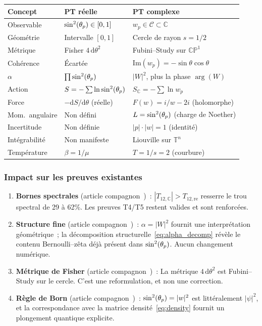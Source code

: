 \documentclass[12pt,a4paper]{article}
\begin{document}
\begin{center}
\begin{tabular}{lll}
\toprule
\textbf{Concept} & \textbf{PT réelle} & \textbf{PT complexe} \\
\midrule
Observable      & $\sin^2(\theta_{p}) \in [0,1]$    & $w_p \in \mathcal{C} \subset \mathbb{C}$ \\
Géométrie       & Intervalle $[0,1]$      & Cercle de rayon $s = 1/2$ \\
Métrique        & Fisher $4\,\mathrm{d}\theta^2$ & Fubini--Study sur $\mathbb{CP}^1$ \\
Cohérence       & Écartée                 & $\mathrm{Im}(w_p) = -\sin\theta\cos\theta$ \\
$\alpha$        & $\prod\sin^2(\theta_{p})$         & $|W|^2$, plus la phase $\arg(W)$ \\
Action          & $S = -\sum\ln\sin^2(\theta_{p})$  & $S_{\mathbb{C}} = -\sum\ln w_p$ \\
Force           & $-\mathrm{d}S/\mathrm{d}\theta$ (réelle) & $F(w) = i/w - 2i$ (holomorphe) \\
Mom.\ angulaire & Non défini              & $L = \sin^2(\theta_{p})$ (charge de Noether) \\
Incertitude     & Non définie             & $|p|\cdot|w| = 1$ (identité) \\
Intégrabilité   & Non manifeste           & Liouville sur $\mathbb{T}^n$ \\
Température     & $\beta = 1/\mu$         & $T = 1/s = 2$ (courbure) \\
\bottomrule
\end{tabular}
\end{center}

\subsubsection{Impact sur les preuves existantes}

\begin{enumerate}[nosep]
\item \textbf{Bornes spectrales} (article
  compagnon~\cite{companion_M3})~:
  $|T_{12,\mathbb{C}}| > T_{12,\mathrm{re}}$ resserre le trou
  spectral de 29 à 62\%. Les preuves T4/T5 restent valides et sont
  renforcées.
\item \textbf{Structure fine} (article
  compagnon~\cite{companion_physics})~:
  $\alpha = |W|^2$ fournit une interprétation géométrique~; la
  décomposition structurelle~\eqref{eq:alpha_decomp} révèle le
  contenu Bernoulli--zêta déjà présent dans $\sin^2(\theta_{p})$. Aucun
  changement numérique.
\item \textbf{Métrique de Fisher} (article
  compagnon~\cite{companion_M2})~:
  La métrique $4\,\mathrm{d}\theta^2$ est Fubini--Study sur le
  cercle. C'est une reformulation, et non une correction.
\item \textbf{Règle de Born} (article
  compagnon~\cite{companion_physics})~:
  $\sin^2(\theta_{p}) = |w|^2$ est littéralement $|\psi|^2$, et la
  correspondance avec la matrice densité~\eqref{eq:density} fournit
  un plongement quantique explicite.
\end{enumerate}
\end{document}

